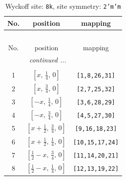 \documentclass[fleqn,8pt]{jsarticle}
\begin{document}
\begin{longtable}{ccc}
\caption{Wyckoff site: {\tt 8k}, site symmetry: {\tt 2'm'm}}
 \\
 \hline \hline
No. & position & mapping \\ \hline \endfirsthead

\multicolumn{2}{l}{\tablename\ \thetable{}} \\
 \hline \hline
No. & position & mapping \\ \hline \endhead

 \hline \hline
\multicolumn{2}{r}{\footnotesize\it continued ...} \\ \endfoot

 \hline \hline
\multicolumn{2}{r}{} \\ \endlastfoot

1 & $\left[ x,\, \frac{1}{4},\, 0 \right]$ & {\tt [1,8,26,31]} \\ \hline
2 & $\left[ x,\, \frac{3}{4},\, 0 \right]$ & {\tt [2,7,25,32]} \\ \hline
3 & $\left[ - x,\, \frac{1}{4},\, 0 \right]$ & {\tt [3,6,28,29]} \\ \hline
4 & $\left[ - x,\, \frac{3}{4},\, 0 \right]$ & {\tt [4,5,27,30]} \\ \hline
5 & $\left[ x + \frac{1}{2},\, \frac{3}{4},\, 0 \right]$ & {\tt [9,16,18,23]} \\ \hline
6 & $\left[ x + \frac{1}{2},\, \frac{1}{4},\, 0 \right]$ & {\tt [10,15,17,24]} \\ \hline
7 & $\left[ \frac{1}{2} - x,\, \frac{3}{4},\, 0 \right]$ & {\tt [11,14,20,21]} \\ \hline
8 & $\left[ \frac{1}{2} - x,\, \frac{1}{4},\, 0 \right]$ & {\tt [12,13,19,22]} \\
\end{longtable}
\renewcommand{\arraystretch}{1.2}
\end{document}
